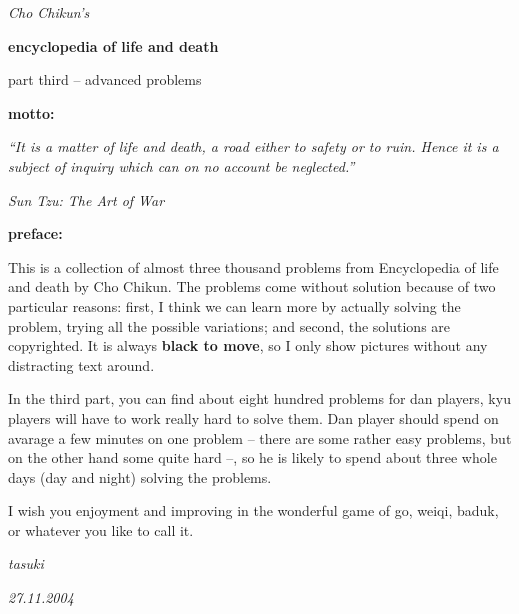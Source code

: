 \documentclass[11pt]{book}
\begin{document}
\begin{titlepage}

    \vspace*{0.2\textheight}

    \begin{center}
        \textit{\large Cho Chikun's}
    \end{center}
    \begin{center}
        \textbf{\huge encyclopedia of life and death}
    \end{center}
    \begin{center}
        {\large part third -- advanced problems}
    \end{center}

\end{titlepage}

\newpage %


\noindent\textbf{\Large motto:}

\medskip
\textit{\normalsize ``It is a matter of life and death, a road either to safety or to ruin. Hence it is a subject of inquiry which can on no account be neglected.''}

\medskip
\hfill {\it Sun Tzu: The Art of War}
\bigskip

\noindent\textbf{\Large preface:}

\medskip
{
\normalsize
This is a collection of almost three thousand problems from Encyclopedia of life and death by Cho Chikun. The problems come without solution because of two particular reasons: first, I think we can learn more by actually solving the problem, trying all the possible variations; and second, the solutions are copyrighted. It is always {\bf black to move}, so I only show pictures without any distracting text around.

In the third part, you can find about eight hundred problems for dan players, kyu players will have to work really hard to solve them. Dan player should spend on avarage a few minutes on one problem  -- there are some rather easy problems, but on the other hand some quite hard --, so he is likely to spend about three whole days (day and night) solving the problems.

I wish you enjoyment and improving in the wonderful game of go, weiqi, baduk, or whatever you like to call it.
}

\medskip
\hfill \textit{tasuki}

\hfill \textit{27.11.2004}

\newpage %


\begin{multicols}{2}
    
\end{multicols}
\end{document}
